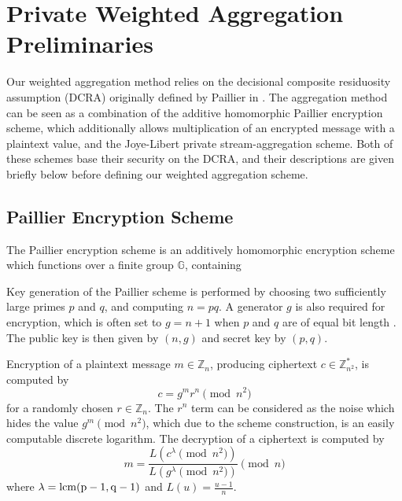 \documentclass[twocolumn]{autart}    %
\begin{document}
\section{Private Weighted Aggregation Preliminaries}



Our weighted aggregation method relies on the decisional composite residuosity assumption (DCRA) originally defined by Paillier in \cite{paillierPublicKeyCryptosystemsBased1999}. The aggregation method can be seen as a combination of the additive homomorphic Paillier encryption scheme, which additionally allows multiplication of an encrypted message with a plaintext value, and the Joye-Libert private stream-aggregation scheme. Both of these schemes base their security on the DCRA, and their descriptions are given briefly below before defining our weighted aggregation scheme.



\subsection{Paillier Encryption Scheme}
The Paillier encryption scheme is an additively homomorphic encryption scheme which functions over a finite group $\mathbb{G}$, containing 


Key generation of the Paillier scheme is performed by choosing two sufficiently large primes $p$ and $q$, and computing $n=pq$. A generator $g$ is also required for encryption, which is often set to $g=n+1$ when $p$ and $q$ are of equal bit length \cite{}. The public key is then given by $(n, g)$ and secret key by $(p, q)$.

Encryption of a plaintext message $m \in \mathbb{Z}_n$, producing ciphertext $c \in \mathbb{Z}^{*}_{n^2}$, is computed by
\begin{equation}
    c = g^m r^n \pmod{n^2}
\end{equation}
for a randomly chosen $r \in \mathbb{Z}_{n}$. The $r^n$ term can be considered as the noise which hides the value $g^m \pmod{n^2}$, which due to the scheme construction, is an easily computable discrete logarithm. The decryption of a ciphertext is computed by
\begin{equation}
    m = \frac{L(c^\lambda\pmod{n^2})}{L(g^\lambda\pmod{n^2})} \pmod{n}
\end{equation}
where $\lambda = \operatorfont{lcm}(p-1, q-1)$ and $L(u) = \frac{u-1}{n}$.
\end{document}
